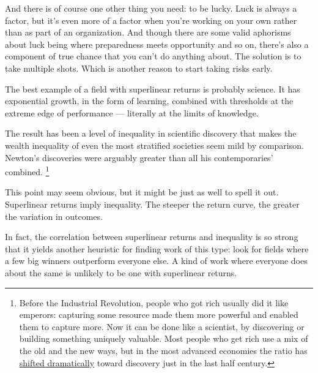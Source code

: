 And there is of course one other thing you need: to be lucky. Luck is
always a factor, but it's even more of a factor when you're working on
your own rather than as part of an organization. And though there are
some valid aphorisms about luck being where preparedness meets
opportunity and so on, there's also a component of true chance that you
can't do anything about. The solution is to take multiple shots. Which
is another reason to start taking risks early.

The best example of a field with superlinear returns is probably
science. It has exponential growth, in the form of learning, combined
with thresholds at the extreme edge of performance --- literally at the
limits of knowledge.

The result has been a level of inequality in scientific discovery that
makes the wealth inequality of even the most stratified societies seem
mild by comparison. Newton's discoveries were arguably greater than all
his contemporaries' combined. \footnote{Before the Industrial Revolution, people who got rich usually
did it like emperors: capturing some resource made them more powerful
and enabled them to capture more. Now it can be done like a scientist,
by discovering or building something uniquely valuable. Most people who
get rich use a mix of the old and the new ways, but in the most advanced
economies the ratio has \href{richnow.html}{shifted dramatically} toward
discovery just in the last half century.}

This point may seem obvious, but it might be just as well to spell it
out. Superlinear returns imply inequality. The steeper the return curve,
the greater the variation in outcomes.

In fact, the correlation between superlinear returns and inequality is
so strong that it yields another heuristic for finding work of this
type: look for fields where a few big winners outperform everyone else.
A kind of work where everyone does about the same is unlikely to be one
with superlinear returns.

